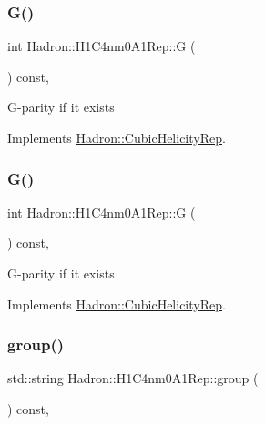 \subsubsection{\texorpdfstring{G()}{G()}\hspace{0.1cm}{\footnotesize\ttfamily [1/2]}}
{\footnotesize\ttfamily int Hadron\+::\+H1\+C4nm0\+A1\+Rep\+::G (\begin{DoxyParamCaption}{ }\end{DoxyParamCaption}) const\hspace{0.3cm}{\ttfamily [inline]}, {\ttfamily [virtual]}}

G-\/parity if it exists 

Implements \mbox{\hyperlink{structHadron_1_1CubicHelicityRep_a50689f42be1e6170aa8cf6ad0597018b}{Hadron\+::\+Cubic\+Helicity\+Rep}}.

\mbox{\label{structHadron_1_1H1C4nm0A1Rep_ac3ccdfe680b252157327562d9f175c65}} 
\subsubsection{\texorpdfstring{G()}{G()}\hspace{0.1cm}{\footnotesize\ttfamily [2/2]}}
{\footnotesize\ttfamily int Hadron\+::\+H1\+C4nm0\+A1\+Rep\+::G (\begin{DoxyParamCaption}{ }\end{DoxyParamCaption}) const\hspace{0.3cm}{\ttfamily [inline]}, {\ttfamily [virtual]}}

G-\/parity if it exists 

Implements \mbox{\hyperlink{structHadron_1_1CubicHelicityRep_a50689f42be1e6170aa8cf6ad0597018b}{Hadron\+::\+Cubic\+Helicity\+Rep}}.

\mbox{\label{structHadron_1_1H1C4nm0A1Rep_a5f7db1ef15b67eaee1c5fc81ed9ec2bd}} 
\subsubsection{\texorpdfstring{group()}{group()}\hspace{0.1cm}{\footnotesize\ttfamily [1/3]}}
{\footnotesize\ttfamily std\+::string Hadron\+::\+H1\+C4nm0\+A1\+Rep\+::group (\begin{DoxyParamCaption}{ }\end{DoxyParamCaption}) const\hspace{0.3cm}{\ttfamily [inline]}, {\ttfamily [virtual]}}


